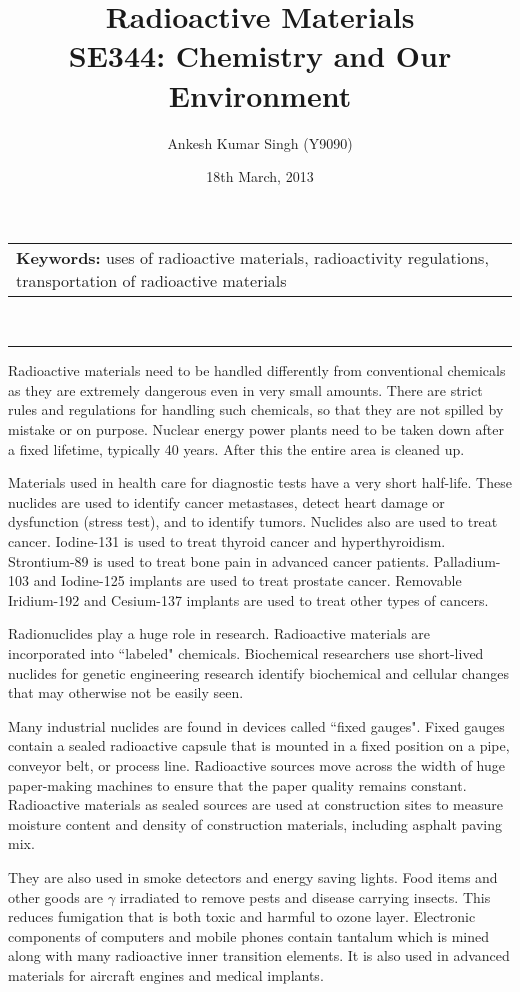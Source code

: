 \documentclass[pdftex,12pt,a4paper]{article}
\title{\vspace{-15pt}Radioactive Materials\\ SE344: Chemistry and Our Environment}
\author{Ankesh Kumar Singh (Y9090)}
\date{18th March, 2013}
\begin{document}
\maketitle
\begin{tabular}{p{370pt}}
\textbf{Keywords: }uses of radioactive materials, radioactivity regulations, transportation of radioactive materials
\end{tabular}
\vspace{10pt}\\
\hrule
\vspace{10pt}
Radioactive materials need to be handled differently from conventional chemicals as they are extremely dangerous even in very small amounts. There are strict rules and regulations for handling such chemicals, so that they are not spilled by mistake or on purpose. Nuclear energy power plants need to be taken down after a fixed lifetime, typically 40 years. After this the entire area is cleaned up.

Materials used in health care for diagnostic tests have a very short half-life. These nuclides are used to identify cancer metastases, detect heart damage or dysfunction (stress test), and to identify tumors. Nuclides also are used to treat cancer. Iodine-131 is used to treat thyroid cancer and hyperthyroidism. Strontium-89 is used to treat bone pain in advanced cancer patients. Palladium-103 and Iodine-125 implants are used to treat prostate cancer. Removable Iridium-192 and Cesium-137 implants are used to treat other types of cancers.

Radionuclides play a huge role in research. Radioactive materials are incorporated into ``labeled" chemicals. Biochemical researchers use short-lived nuclides for genetic engineering research identify biochemical and cellular changes that may otherwise not be easily seen. 

Many industrial nuclides are found in devices called ``fixed gauges". Fixed gauges contain a sealed radioactive capsule that is mounted in a fixed position on a pipe, conveyor belt, or process line. Radioactive sources move across the width of huge paper-making machines to ensure that the paper quality remains constant. Radioactive materials as sealed sources are used at construction sites to measure moisture content and density of construction materials, including asphalt paving mix.

They are also used in smoke detectors and energy saving lights. Food items and other goods are $\gamma$ irradiated to remove pests and disease carrying insects. This reduces fumigation that is both toxic and harmful to ozone layer. Electronic components of computers and mobile phones contain tantalum which is mined along with many radioactive inner transition elements. It is also used in advanced materials for aircraft engines and medical implants.
\end{document}

